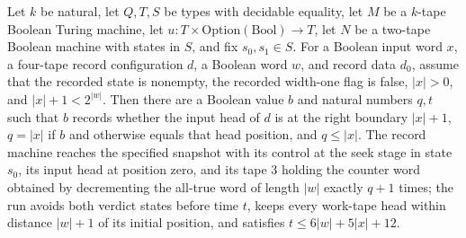 \begin{theorem}
\label{Turing.recordStep_prepare_native}
\leanok
{}
Let $k$ be natural, let $Q,T,S$ be types with decidable equality, let $M$ be a $k$-tape
Boolean Turing machine, let $u:T\times\mathrm{Option}(\mathrm{Bool})\to T$, let $N$ be a
two-tape Boolean machine with states in $S$, and fix $s_0,s_1\in S$. For a Boolean input
word $x$, a four-tape record configuration $d$, a Boolean word $w$, and record data
$d_0$, assume that the recorded state is nonempty, the recorded width-one flag is false,
$|x|>0$, and $|x|+1<2^{|w|}$. Then there are a Boolean value $b$ and natural numbers
$q,t$ such that $b$ records whether the input head of $d$ is at the right boundary
$|x|+1$, $q=|x|$ if $b$ and otherwise equals that head position, and $q\le |x|$. The
record machine reaches the specified snapshot with its control at the seek stage in
state $s_0$, its input head at position zero, and its tape 3 holding the counter word
obtained by decrementing the all-true word of length $|w|$ exactly $q+1$ times; the run
avoids both verdict states before time $t$, keeps every work-tape head within distance
$|w|+1$ of its initial position, and satisfies $t\le 6|w|+5|x|+12$.
\end{theorem}

